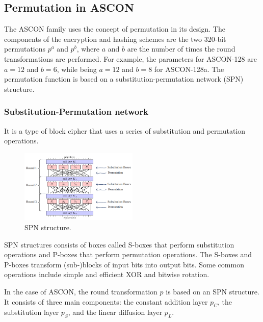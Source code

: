 \subsection{Permutation in ASCON}
The ASCON family uses the concept of permutation in its design. The components of the encryption and hashing schemes are the two 320-bit permutations $p^a$ and $p^b$, where $a$ and $b$ are the number of times the round transformations are performed. For example, the parameters for ASCON-128 are $a = 12$ and $b = 6$, while being $a = 12$ and $b = 8$ for ASCON-128a. The permutation function is based on a substitution-permutation network (SPN) structure. \cite{DBLP:journals/joc/DobraunigEMS21, ascon_specification} \par

\subsubsection{Substitution-Permutation network}

It is a type of block cipher that uses a series of substitution and permutation operations.

\begin{figure}[htbp]
  \centering
  \includegraphics[width=0.5\textwidth]{images/spn.png}
  \caption{SPN structure.}
  \label{fig:spn}
\end{figure}

SPN structures consists of boxes called S-boxes that perform substitution operations and P-boxes that perform permutation operations. The S-boxes and P-boxes transform (sub-)blocks of input bits into output bits. Some common operations include simple and efficient XOR and bitwise rotation. \cite{mustafeez}

In the case of ASCON, the round transformation $p$ is based on an SPN structure. It consists of three main components: the constant addition  layer $p_C$, the substitution layer $p_S$, and the linear diffusion layer $p_L$. \cite{DBLP:journals/joc/DobraunigEMS21, ascon_specification} \par

